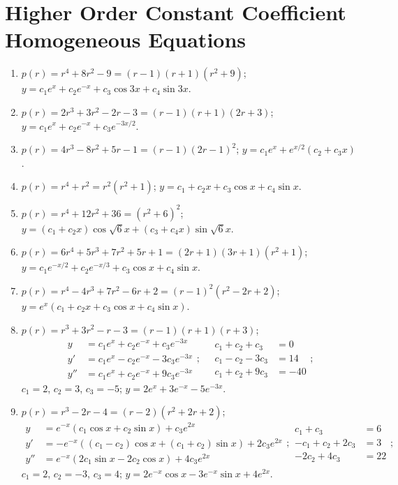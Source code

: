 \documentclass[openany]{book}
\newenvironment{sectionSolutions}{
 \begin{enumerate}[item-label={\thesection.\arabic{enumi}.}]
}{
 \end{enumerate}
}
\begin{document}
\section{Higher Order Constant Coefficient Homogeneous Equations}
\begin{sectionSolutions}
\item
$p(r)=r^4+8r^2-9=(r-1)(r+1)(r^2+9)$;
 $y=c_1e^x+c_2e^{-x}+c_3\cos3x+c_4\sin3x$.




\item
$p(r)=2r^3+3r^2-2r-3=(r-1)(r+1)(2r+3)$;
$y=c_1e^x+c_2e^{-x}+c_3e^{-3x/2}$.


\item
$p(r)=4r^3-8r^2+5r-1=(r-1)(2r-1)^2$;
$y=c_1e^x+e^{x/2}(c_2+c_3x)$.

\item
$p(r)=r^4+r^2=r^2(r^2+1)$;
 $y=c_1+c_2x+c_3\cos x+c_4\sin x$.


\item
$p(r)=r^4+12r^2+36=(r^2+6)^2$;
 $y=(c_1+c_2x)\cos\sqrt{6} x+(c_3+c_4x)\sin\sqrt{6} x$.


\item
$p(r)=6r^4+5r^3+7r^2+5r+1=(2r+1)(3r+1)(r^2+1)$;
$y=c_1e^{-x/2}+c_2e^{-x/3}+c_3\cos x+c_4\sin x$.


\item
$p(r)=r^4-4r^3+7r^2-6r+2=(r-1)^2(r^2-2r+2)$;
$y=e^x(c_1+c_2x+c_3\cos x+c_4\sin x)$.


\item
$p(r)=r^3+3r^2-r-3=(r-1)(r+1)(r+3)$;
\[
\begin{aligned}
y&=c_1e^x+c_2e^{-x}+c_3e^{-3x}\\
y'&=c_1e^x-c_2e^{-x}-3c_3e^{-3x}\\
y''&=c_1e^x+c_2e^{-x}+9c_3e^{-3x}
\end{aligned};\quad
\begin{aligned}
c_1+c_2+c_3&=0\\
c_1-c_2-3c_3&=14\\
c_1+c_2+9c_3&=-40
\end{aligned};
\]
$c_1=2$, $c_2=3$, $c_3=-5$;
 $y=2e^x+3e^{-x}-5e^{-3x}$.


\item
$p(r)=r^3-2r-4=(r-2)(r^2+2r+2)$;
\[
\begin{aligned}
y&=e^{-x}(c_1\cos x+c_2\sin x)+c_3e^{2x}\\
y'&=-e^{-x}((c_1-c_2)\cos x+(c_1+c_2)\sin x)+2c_3e^{2x}\\
y''&=e^{-x}(2c_1\sin x-2c_2\cos x)+4c_3e^{2x}
\end{aligned};
\begin{aligned}
c_1+c_3&=6\\
-c_1+c_2+2c_3&=3\\
-2c_2+4c_3&=22
\end{aligned};
\]
$c_1=2$, $c_2=-3$, $c_3=4$;
 $y=2e^{-x}\cos x-3e^{-x}\sin x+4e^{2x}$.



\end{sectionSolutions}
\end{document}
